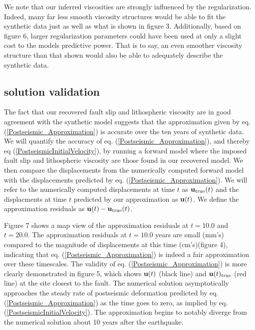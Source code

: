 \documentclass[12pt]{article}
\begin{document}
We note that our inferred viscosities are strongly influenced by the
regularization.  Indeed, many far less smooth viscosity structures
would be able to fit the synthetic data just as well as what is shown
in figure 3.  Additionally, based on figure 6, larger regularization
parameters could have been used at only a slight cost to the models
predictive power.  That is to say, an even smoother viscosity
structure than that shown would also be able to adequately describe the
synthetic data.

\subsection{solution validation}
The fact that our recovered fault slip and lithospheric viscosity are
in good agreement with the synthetic model suggests that the
approximation given by eq. (\ref{Postseismic_Approximation}) is
accurate over the ten years of synthetic data.  We will quantify the
accuracy of eq. (\ref{Postseismic_Approximation}), and thereby eq
(\ref{PostseismicInitialVelocity}), by running a forward model where
the imposed fault slip and lithospheric viscosity are those found in
our recovered model.  We then compare the displacements from the
numerically computed forward model with the displacements predicted by
eq. (\ref{Postseismic_Approximation}).  We will refer to the
numerically computed displacements at time $t$ as
$\bold{u}_{\mathrm{true}}(t)$ and the displacments at time $t$
predicted by our approximation as $\bold{u}(t)$.  We define the
approximation residuals as $\bold{u}(t) - \bold{u}_{\mathrm{true}}(t)$.

Figure 7 shows a map view of the approximation residuals at $t=10.0$
and $t=20.0$.  The approximation residuals at $t=10.0$ years are small
(mm's) compared to the magnitude of displacements at this time
(cm's)(figure 4), indicating that
eq. (\ref{Postseismic_Approximation}) is indeed a fair approximation
over these timescales.  The validity of
eq. (\ref{Postseismic_Approximation}) is more clearly demonstrated in
figure 5, which shows $\bold{u}(t)$ (black line) and
$\bold{u}(t)_{\mathrm{true}}$ (red line) at the site closest to the
fault.  The numerical solution asymptotically approaches the steady
rate of postseismic deformation predicted by
eq. (\ref{Postseismic_Approximation}) as the time goes to zero, as
implied by eq. (\ref{PostseismicInitialVelocity}).  The approximation
begins to notably diverge from the numerical solution about 10 years
after the earthquake.
\end{document}
